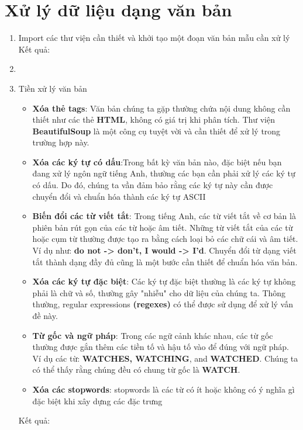 \section{Xử lý dữ liệu dạng văn bản}

\begin{enumerate}
	\item Import các thư viện cần thiết và khởi tạo một đoạn văn bản mẫu cần xử lý 
	Kết quả: 
	
	\item
	\item Tiền xử lý văn bản \cite{WEBSITE:10}
	\begin{itemize}
		\item \textbf{Xóa thẻ tags}: Văn bản chúng ta gặp thường chứa nội dung không cần thiết như các thẻ \textbf{HTML}, không có giá trị khi phân tích. Thư viện \textbf{BeautifulSoup} là một công cụ tuyệt vời và cần thiết để xử lý trong trường hợp này.
		\item \textbf{Xóa các ký tự có dấu}:Trong bất kỳ văn bản nào, đặc biệt nếu bạn đang xử lý ngôn ngữ tiếng Anh, thường các bạn cần phải xử lý các ký tự có dấu. Do đó, chúng ta vần đảm bảo rằng các ký tự này cần được chuyển đổi và chuẩn hóa thành các ký tự ASCII
		\item \textbf{Biến đổi các từ viết tắt}: Trong tiếng Anh, các từ viết tắt về cơ bản là phiên bản rút gọn của các từ hoặc âm tiết. Những từ viết tắt của các từ hoặc cụm từ thường được tạo ra bằng cách loại bỏ các chữ cái và âm tiết. Ví dụ như: \textbf{do not -> don't, I would -> I'd}. Chuyển đổi từ dạng viết tắt thành dạng đầy đủ cũng là một bước cần thiết để chuẩn hóa văn bản.
		\item \textbf{Xóa các ký tự đặc biệt}: Các ký tự đặc biệt thường là các ký tự không phải là chữ và số, thường gây "nhiễu" cho dữ liệu của chúng ta. Thông thường, regular expressions \textbf{(regexes)} có thể được sử dụng để xử lý vấn đề này.
		\item \textbf{Từ gốc và ngữ pháp}:  Trong các ngữ cảnh khác nhau, các từ gốc thường được gắn thêm các tiền tố và hậu tố vào để đúng với ngữ pháp. Ví dụ các từ: \textbf{WATCHES, WATCHING}, and \textbf{WATCHED}. Chúng ta có thể thấy rằng chúng đều có chung từ gốc là \textbf{WATCH}.
		\item \textbf{Xóa các stopwords}: stopwords là các từ có ít hoặc không có ý nghĩa gì đặc biệt khi xây dựng các đặc trưng
	\end{itemize}
	
	
	Kết quả:
	
	

\end{enumerate}

